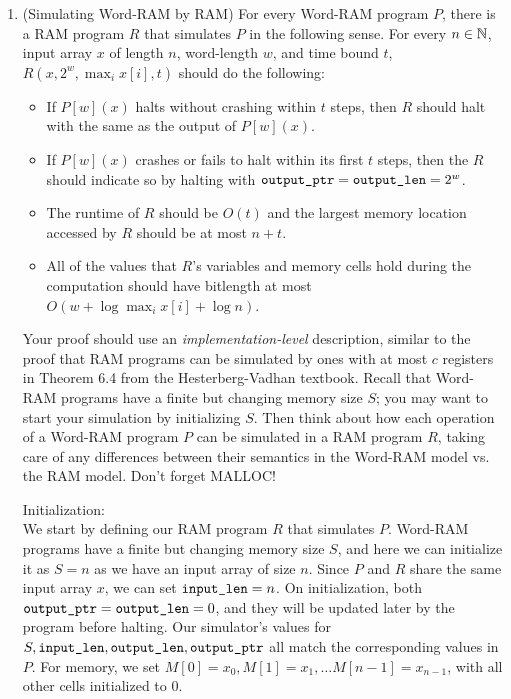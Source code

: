 \documentclass[11pt]{article}
\begin{document}
\begin{enumerate}
\begin{enumerate}
        

  
\end{enumerate}





\item (Simulating Word-RAM by RAM)
For every Word-RAM program $P$, there is a RAM program $R$ that simulates $P$ in the following sense.  For every $n \in \mathbb{N}$, input array $x$ of length $n$, word-length $w$, and time bound $t$, $R(x,2^w, \max_i x[i],t)$ should do the following:
\begin{itemize}
    \item If $P[w](x)$ halts without crashing within $t$ steps, then $R$ should halt with the same as the output of $P[w](x)$.
    \item If $P[w](x)$ crashes or fails to halt within its first $t$ steps, then the $R$ should indicate so by halting with $\texttt{output\_ptr}=\texttt{output\_len}=2^w$.
    \item The runtime of $R$ should be $O(t)$ and the largest memory location accessed by $R$ should be at most $n+t$.
    \item All of the values that $R$'s variables and memory cells hold during the computation should have bitlength at most $O(w+\log \max_i x[i] + \log n)$.
\end{itemize}
Your proof should use an {\em implementation-level} description, similar to the proof that RAM programs can be simulated by ones with at most $c$ registers in Theorem 6.4 from the Hesterberg-Vadhan textbook.  Recall that Word-RAM programs have a finite but changing memory size $S$; you may want to start your simulation by initializing $S$.  Then think about how each operation of a Word-RAM program $P$ can be simulated in a RAM program $R$, taking care of any differences between their semantics in the Word-RAM model vs. the RAM model. Don't forget MALLOC!


Initialization: \\
We start by defining our RAM program $R$ that simulates $P$. 
Word-RAM programs have a finite but changing memory size $S$, and here we can initialize it as $S = n$ as we have an input array of size $n$. 
Since $P$ and $R$ share the same input array $x$, we can set $\texttt{input\_len} = n$. On initialization, both $\texttt{output\_ptr} = \texttt{output\_len} = 0$, and they will be updated later by the program before halting. 
Our simulator’s values for $S, \texttt{input\_len}, \texttt{output\_len}, \texttt{output\_ptr}$ all match the corresponding values in $P$. 
For memory, we set $M[0] = x_0, M[1] = x_1, \dots M[n - 1] = x_{n-1}$, with all other cells initialized to $0$. 


\end{enumerate}
\end{document}

